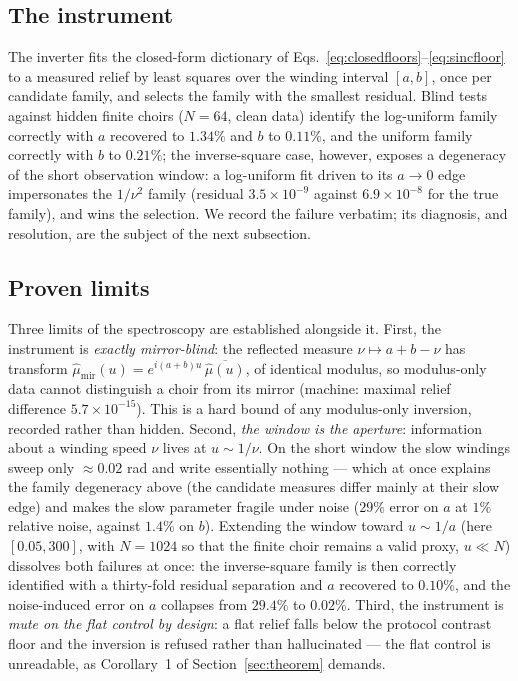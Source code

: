 \documentclass[11pt,a4paper]{article}
\begin{document}
\subsection{The instrument}
\label{sec:instrument}

The inverter fits the closed-form dictionary of
Eqs.~\eqref{eq:closedfloors}--\eqref{eq:sincfloor} to a measured relief
by least squares over the winding interval $[a, b]$, once per candidate
family, and selects the family with the smallest residual. Blind tests
against hidden finite choirs ($N = 64$, clean data) identify the
log-uniform family correctly with $a$ recovered to $1.34\%$ and $b$ to
$0.11\%$, and the uniform family correctly with $b$ to $0.21\%$; the
inverse-square case, however, exposes a degeneracy of the short
observation window: a log-uniform fit driven to its $a \to 0$ edge
impersonates the $1/\nu^2$ family (residual $3.5\times10^{-9}$ against
$6.9\times10^{-8}$ for the true family), and wins the selection. We
record the failure verbatim; its diagnosis, and resolution, are the
subject of the next subsection.

\subsection{Proven limits}
\label{sec:limits}

Three limits of the spectroscopy are established alongside it. First,
the instrument is \emph{exactly mirror-blind}: the reflected measure
$\nu \mapsto a + b - \nu$ has transform
$\hat{\mu}_{\mathrm{mir}}(u) = e^{i(a+b)u}\,\overline{\hat{\mu}(u)}$,
of identical modulus, so modulus-only data cannot distinguish a choir
from its mirror (machine: maximal relief difference $5.7\times10^{-15}$).
This is a hard bound of any modulus-only inversion, recorded rather than
hidden. Second, \emph{the window is the aperture}: information about a
winding speed $\nu$ lives at $u \sim 1/\nu$. On the short window the
slow windings sweep only $\approx 0.02$ rad and write essentially
nothing --- which at once explains the family degeneracy above (the
candidate measures differ mainly at their slow edge) and makes the slow
parameter fragile under noise ($29\%$ error on $a$ at $1\%$ relative
noise, against $1.4\%$ on $b$). Extending the window toward
$u \sim 1/a$ (here $[0.05, 300]$, with $N = 1024$ so that the finite
choir remains a valid proxy, $u \ll N$) dissolves both failures at once:
the inverse-square family is then correctly identified with a
thirty-fold residual separation and $a$ recovered to $0.10\%$, and the
noise-induced error on $a$ collapses from $29.4\%$ to $0.02\%$. Third,
the instrument is \emph{mute on the flat control by design}: a flat relief
falls below the protocol contrast floor and the inversion is refused
rather than hallucinated --- the flat control is unreadable, as
Corollary~1 of Section~\ref{sec:theorem} demands.
\end{document}
